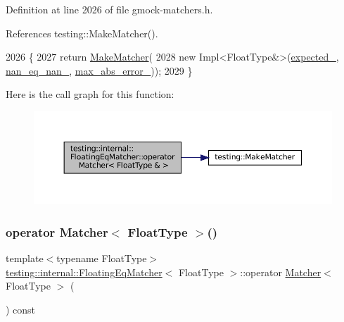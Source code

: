 Definition at line 2026 of file gmock-\/matchers.\+h.



References testing\+::\+Make\+Matcher().


\begin{DoxyCode}
2026                                        \{
2027     \textcolor{keywordflow}{return} \hyperlink{namespacetesting_a37fd8029ac00e60952440a3d9cca8166}{MakeMatcher}(
2028         \textcolor{keyword}{new} Impl<FloatType&>(\hyperlink{classtesting_1_1internal_1_1FloatingEqMatcher_a01d4d3ee6344cd3d88c53dd6e730b9df}{expected\_}, \hyperlink{classtesting_1_1internal_1_1FloatingEqMatcher_a782b06cb55b4989c3c67facf910265bf}{nan\_eq\_nan\_}, 
      \hyperlink{classtesting_1_1internal_1_1FloatingEqMatcher_a06b3fd6f9ee60bc694a12ccaeba2924a}{max\_abs\_error\_}));
2029   \}
\end{DoxyCode}
Here is the call graph for this function\+:
\nopagebreak
\begin{figure}[H]
\begin{center}
\leavevmode
\includegraphics[width=350pt]{classtesting_1_1internal_1_1FloatingEqMatcher_ae75e5b64f04010c5580312562fcf98e5_cgraph}
\end{center}
\end{figure}
\mbox{\label{classtesting_1_1internal_1_1FloatingEqMatcher_abd377dfafd89bdb7effdd80989aeee80}} 
\subsubsection{\texorpdfstring{operator Matcher$<$ Float\+Type $>$()}{operator Matcher< FloatType >()}}
{\footnotesize\ttfamily template$<$typename Float\+Type$>$ \\
\hyperlink{classtesting_1_1internal_1_1FloatingEqMatcher}{testing\+::internal\+::\+Floating\+Eq\+Matcher}$<$ Float\+Type $>$\+::operator \hyperlink{classtesting_1_1Matcher}{Matcher}$<$ Float\+Type $>$ (\begin{DoxyParamCaption}{ }\end{DoxyParamCaption}) const\hspace{0.3cm}{\ttfamily [inline]}}



